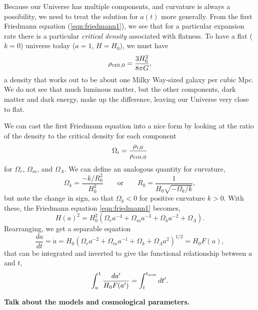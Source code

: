Because our Universe has multiple components, and curvature is always a possibility, we need to treat the solution for $a(t)$ more generally.  From the first Friedmann equation (\ref{eqn:friedmann1}), we see that for a particular expansion rate there is a particular \textit{critical density} associated with flatness.  To have a flat ($k=0$) universe today ($a=1$, $H=H_0$), we must have
\begin{equation}
  \rho_{\rm crit,0}   = \frac{3 H_0^2}{8\pi G},
\end{equation}
a density that works out to be about one Milky Way-sized galaxy per cubic Mpc.  We do not see that much luminous matter, but the other components, dark matter and dark energy, make up the difference, leaving our Universe very close to flat.

We can cast the first Friedmann equation into a nice form by looking at the ratio of the density to the critical density for each component
\begin{equation}
  \Omega_i = \frac{\rho_{i,0}}{\rho_{\rm crit,0}}
\end{equation}
for $\Omega_r$, $\Omega_m$, and $\Omega_\Lambda$.
We can define an analogous quantity for curvature, 
\begin{equation}
  \Omega_k = \frac{-k/R_0^2}{H_0^2}   \qquad \mbox{or} \qquad R_0 = \frac{1}{H_0\sqrt{-\Omega_k / k}},
\end{equation}
but note the change in sign, so that $\Omega_k<0$ for positive curvature $k>0$.  With these, the Friedmann equation \ref{eqn:friedmann1} becomes,
\begin{equation}
  H(a)^2 = H_0^2 ( \Omega_r a^{-4} + \Omega_m a^{-3} + \Omega_k  a^{-2}+  \Omega_\Lambda ).
\end{equation}
Rearranging, we get a separable equation
\begin{equation}
\frac{da}{dt} = \dot a = H_0 (\Omega_r a^{-2} + \Omega_m a^{-1} + \Omega_k  +  \Omega_\Lambda a^2)^{1/2} = H_0 F(a),
\end{equation}
that can be integrated and inverted to give the functional relationship between $a$ and $t$,
\begin{equation}
  \int^1_a \frac{da'}{H_0 F(a')} =  \int^{t_{\rm now}}_t dt'.
\end{equation}

\textbf{Talk about the models and cosmological parameters.}

